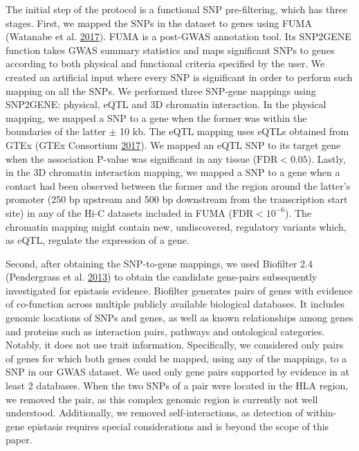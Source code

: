 \documentclass[
  11pt,
]{env/yjiao}
\begin{document}
The initial step of the protocol is a functional SNP pre-filtering,
which has three stages. First, we mapped the SNPs in the dataset to
genes using FUMA (Watanabe et al. \protect\hyperlink{ref-watanabe_functional_2017}{2017}). FUMA is a post-GWAS
annotation tool. Its SNP2GENE function takes GWAS summary statistics and
maps significant SNPs to genes according to both physical and functional
criteria specified by the user. We created an artificial input where
every SNP is significant in order to perform such mapping on all the
SNPs. We performed three SNP-gene mappings using SNP2GENE: physical,
eQTL and 3D chromatin interaction. In the physical mapping, we mapped a
SNP to a gene when the former was within the boundaries of the latter
\(\pm\) 10 kb. The eQTL mapping uses eQTLs obtained
from GTEx (GTEx Consortium \protect\hyperlink{ref-gtex_consortium_genetic_2017}{2017}). We mapped an eQTL SNP to its target gene when the
association P-value was significant in any tissue (\(\text{FDR} < 0.05\)).
Lastly, in the 3D chromatin interaction mapping, we mapped a SNP to a
gene when a contact had been observed between the former and the region
around the latter's promoter (250 bp upstream and 500 bp downstream from
the transcription start site) in any of the Hi-C datasets included in
FUMA (\(\text{FDR} < 10^{-6}\)). The chromatin mapping might contain new,
undiscovered, regulatory variants which, as eQTL, regulate the expression
of a gene.

Second, after obtaining the SNP-to-gene mappings, we used Biofilter 2.4
(Pendergrass et al. \protect\hyperlink{ref-pendergrass_genomic_2013}{2013}) to obtain the candidate gene-pairs
subsequently investigated for epistasis evidence. Biofilter generates
pairs of genes with evidence of co-function across multiple publicly
available biological databases. It includes genomic locations of SNPs
and genes, as well as known relationships among genes and proteins such
as interaction pairs, pathways and ontological categories.
Notably, it does not use trait information.
Specifically, we considered only pairs of genes for which both genes
could be mapped, using any of the mappings, to a SNP in our GWAS
dataset. We used only gene pairs supported by evidence in at least 2
databases. When the two SNPs of a pair were located in the HLA region,
we removed the pair, as this complex genomic region is currently not
well understood. Additionally, we removed self-interactions, as
detection of within-gene epistasis requires special considerations and
is beyond the scope of this paper.
\end{document}
